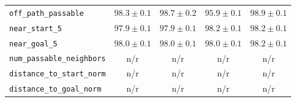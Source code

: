 \begin{table}[t]
\begin{tabular}{@{}lcccc@{}}
\texttt{off\_path\_passable} & $98.3 \pm 0.1$ & $98.7 \pm 0.2$ & $95.9 \pm 0.1$ & $98.9 \pm 0.1$ \\
\texttt{near\_start\_5} & $97.9 \pm 0.1$ & $97.9 \pm 0.1$ & $98.2 \pm 0.1$ & $98.2 \pm 0.1$ \\
\texttt{near\_goal\_5} & $98.0 \pm 0.1$ & $98.0 \pm 0.1$ & $98.0 \pm 0.1$ & $98.2 \pm 0.1$ \\
\texttt{num\_passable\_neighbors} & n/r & n/r & n/r & n/r \\
\texttt{distance\_to\_start\_norm} & n/r & n/r & n/r & n/r \\
\texttt{distance\_to\_goal\_norm} & n/r & n/r & n/r & n/r \\
\bottomrule
\end{tabular}
\end{table}

